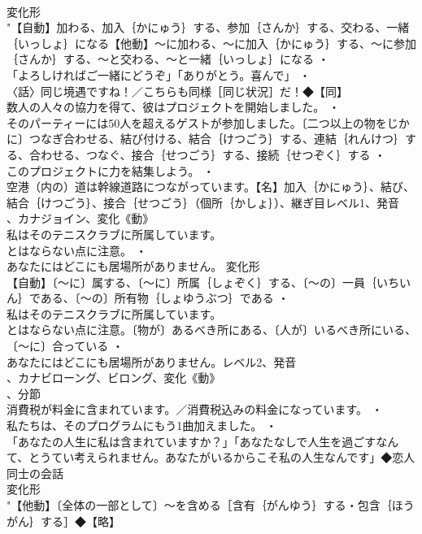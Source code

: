 \documentclass[8pt]{extreport}
\begin{document}
\begin{CJK}{UTF8}{min}
\\	変化形 
\\	"【自動】加わる、加入｛かにゅう｝する、参加｛さんか｝する、交わる、一緒｛いっしょ｝になる【他動】～に加わる、～に加入｛かにゅう｝する、～に参加｛さんか｝する、～と交わる、～と一緒｛いっしょ｝になる ・
\\	「よろしければご一緒にどうぞ」「ありがとう。喜んで」 ・
\\	〈話〉同じ境遇ですね！／こちらも同様［同じ状況］だ！◆【同】
\\	数人の人々の協力を得て、彼はプロジェクトを開始しました。 ・
\\	そのパーティーには50人を超えるゲストが参加しました。〔二つ以上の物をじかに〕つなぎ合わせる、結び付ける、結合｛けつごう｝する、連結｛れんけつ｝する、合わせる、つなぐ、接合｛せつごう｝する、接続｛せつぞく｝する ・
\\	このプロジェクトに力を結集しよう。 ・
\\	空港（内の）道は幹線道路につながっています。【名】加入｛かにゅう｝、結び、結合｛けつごう｝、接合｛せつごう｝（個所｛かしょ｝）、継ぎ目レベル1、発音
\\	、カナジョイン、変化《動》
\\	私はそのテニスクラブに所属しています。
\\	とはならない点に注意。 ・
\\	あなたにはどこにも居場所がありません。	変化形 
\\	【自動】〔～に〕属する、〔～に〕所属｛しょぞく｝する、〔～の〕一員｛いちいん｝である、〔～の〕所有物｛しょゆうぶつ｝である ・
\\	私はそのテニスクラブに所属しています。
\\	とはならない点に注意。〔物が〕あるべき所にある、〔人が〕いるべき所にいる、〔～に〕合っている ・
\\	あなたにはどこにも居場所がありません。レベル2、発音
\\	、カナビローング、ビロング、変化《動》
\\	、分節
\\	消費税が料金に含まれています。／消費税込みの料金になっています。 ・
\\	私たちは、そのプログラムにもう1曲加えました。 ・
\\	「あなたの人生に私は含まれていますか？」「あなたなしで人生を過ごすなんて、とうてい考えられません。あなたがいるからこそ私の人生なんです」◆恋人同士の会話
\\	変化形 
\\	"【他動】〔全体の一部として〕～を含める［含有｛がんゆう｝する・包含｛ほうがん｝する］◆【略】

\end{CJK}
\end{document}
